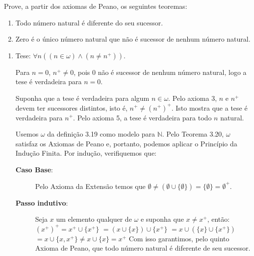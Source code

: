\begin{exercicio}
	Prove, a partir dos axiomas de Peano, os seguintes teoremas:
	\begin{enumerate}[label=(\alph{*})]
		\item Todo número natural é diferente do seu sucessor.
		\item Zero é o único número natural que não é sucessor de nenhum número natural.
	\end{enumerate}
\end{exercicio}

\begin{enumerate}[label=(\alph{*})]
	\item
	\begin{solucao}[ 1]
		Tese: $\forall n((n\in\omega)\wedge(n\neq n^+))$.
		
		Para $n=0$, $n^+\neq0$, pois $0$ não é sucessor de nenhum número natural, logo a tese é verdadeira para $n=0$.
		
		Suponha que a tese é verdadeira para algum $n\in\omega$. Pelo axioma 3, $n$ e $n^+$ devem ter sucessores distintos, isto é, $n^+\neq(n^+)^+$. Isto mostra que a tese é verdadeira para $n^+$. Pelo axioma 5, a tese é verdadeira para todo $n$ natural.
	\end{solucao}
	
	\begin{solucao}[ 2]
			Usemos $\omega$ da definição 3.19 como modelo para $\mathbb{N}$. Pelo Teorema 3.20, $\omega$ satisfaz os Axiomas de Peano e, portanto, podemos aplicar o Princí­pio da Indução Finita. Por indução, verifiquemos que:
			\begin{description}
				\item[\textbf{Caso Base}:] Pelo Axioma da Extensão temos que $\emptyset \neq (\emptyset \cup \{\emptyset\}) = \{\emptyset\} = \emptyset^+$.
				\item[\textbf{Passo indutivo}:] Seja $x$ um elemento qualquer de $\omega$ e suponha que $x \neq x^+$, então: \newline \newline $(x^+)^+ = x^+ \cup \{x^+\}$ \newline $=  (x \cup \{x\}) \cup \{x^+\}$ \newline $= x \cup (\{x\} \cup \{x^+\})$ \newline $= x \cup \{x, x^+\} \neq x \cup \{x\} = x^+$ \newline \newline Com isso garantimos, pelo quinto Axioma de Peano, que todo número natural é diferente de seu sucessor.
			\end{description}
		\end{solucao}
	

\end{enumerate}

